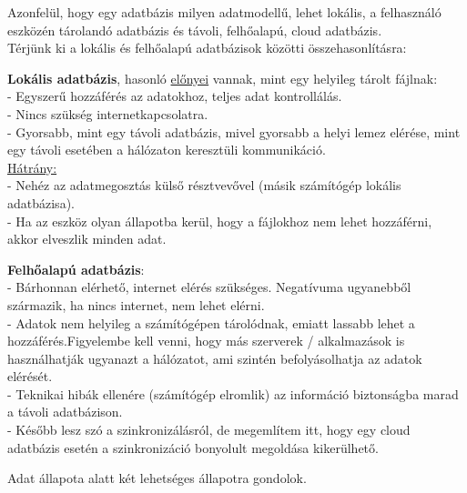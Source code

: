 \vspace{10pt}
\noindent Azonfelül, hogy egy adatbázis milyen adatmodellű, lehet lokális, a felhasználó eszközén tárolandó adatbázis és távoli, felhőalapú, cloud adatbázis.
\\ Térjünk ki a lokális és felhőalapú adatbázisok közötti összehasonlításra: \newline


\noindent \textbf{Lokális adatbázis}, hasonló \underline{előnyei} vannak, mint egy helyileg tárolt fájlnak:
\\- Egyszerű hozzáférés az adatokhoz, teljes adat kontrollálás.
\vspace{5pt}\\- Nincs szükség internetkapcsolatra.
\vspace{5pt}\\- Gyorsabb, mint egy távoli adatbázis, mivel gyorsabb a helyi lemez elérése, mint egy távoli esetében a hálózaton keresztüli kommunikáció.
\vspace{5pt}\\ \underline{Hátrány:}
\\- Nehéz az adatmegosztás külső résztvevővel (másik számítógép lokális adatbázisa).
\vspace{5pt}\\- Ha az eszköz olyan állapotba kerül, hogy a fájlokhoz nem lehet hozzáférni, akkor elveszlik minden adat.\newline

\noindent \textbf{Felhőalapú adatbázis}:
\\- Bárhonnan elérhető, internet elérés szükséges. Negatívuma ugyanebből származik, ha nincs internet, nem lehet elérni.
\vspace{5pt}\\- Adatok nem helyileg a számítógépen tárolódnak, emiatt lassabb lehet a hozzáférés.Figyelembe kell venni, hogy más szerverek / alkalmazások is használhatják ugyanazt a hálózatot, ami szintén befolyásolhatja az adatok elérését.
\vspace{5pt}\\- Teknikai hibák ellenére (számítógép elromlik) az információ biztonságba marad a távoli adatbázison.
\vspace{5pt}\\- Később lesz szó a szinkronizálásról, de megemlítem itt, hogy egy cloud adatbázis esetén a szinkronizáció bonyolult megoldása kikerülhető.

\newpage
{}
Adat állapota alatt két lehetséges állapotra gondolok.

